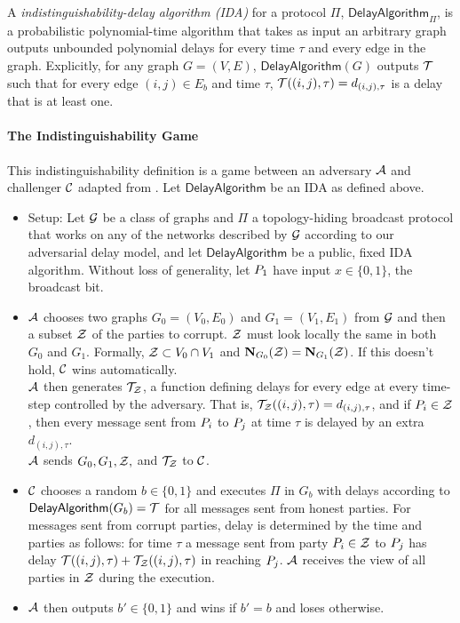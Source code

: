 \newcommand{\delayAlg}{\mathsf{DelayAlgorithm}}
\begin{definition}
	A \emph{indistinguishability-delay algorithm (IDA)} for a protocol $\Pi$, $\mathsf{Delay}$\-$\mathsf{Algorithm}_{\Pi}$, is a probabilistic polynomial-time algorithm that takes as input an arbitrary graph outputs unbounded polynomial delays for every time $\tau$ and every edge in the graph. Explicitly, for any graph $G = (V, E)$, $\delayAlg(G)$ outputs $\mathcal{T}$ such that for every edge $(i,j) \in E_b$ and time $\tau$, $\mathcal{T}((i,j), \tau) = d_{(i,j), \tau}$ is a delay that is at least one.
\end{definition}

\paragraph{The Indistinguishability Game}
This indistinguishability definition is a game between an adversary $\mathcal{A}$ and challenger $\mathcal{C}$ adapted from \cite{MOR15}. Let $\delayAlg$ be an IDA as defined above.
\begin{itemize}
	\item Setup: Let $\mathcal{G}$ be a class of graphs and $\Pi$ a topology-hiding broadcast protocol that works on any of the networks described by $\mathcal{G}$ according to our adversarial delay model, and let $\delayAlg$ be a public, fixed IDA algorithm. Without loss of generality, let $P_1$ have input $x \in \{0,1\}$, the broadcast bit.
	\item $\mathcal{A}$ chooses two graphs $G_0 = (V_0, E_0)$ and $G_1 = (V_1, E_1)$ from $\mathcal{G}$ and then a subset $\mathcal{Z}$ of the parties to corrupt. $\mathcal{Z}$ must look locally the same in both $G_0$ and $G_1$. Formally, $\mathcal{Z} \subset V_0 \cap V_1$ and $\mathbf{N}_{G_{0}}(\mathcal{Z}) = \mathbf{N}_{G_{1}}(\mathcal{Z})$. If this doesn't hold, $\mathcal{C}$ wins automatically.\\
	$\mathcal{A}$ then generates $\mathcal{T}_{\mathcal{Z}}$, a function defining delays for every edge at every time-step controlled by the adversary. That is, $\mathcal{T}_{\mathcal{Z}}((i,j), \tau) = d_{(i,j),\tau}$, and if $P_i \in \mathcal{Z}$, then every message sent from $P_i$ to $P_j$ at time $\tau$ is delayed by an extra $d_{(i,j), \tau}$.\\
	$\mathcal{A}$ sends $G_0, G_1, \mathcal{Z},$ and $\mathcal{T}_{\mathcal{Z}}$ to $\mathcal{C}$.
	
	\item $\mathcal{C}$ chooses a random $b \in \{0,1\}$ and executes $\Pi$ in $G_b$ with delays according to $\delayAlg(G_b) = \cT$ for all messages sent from honest parties. For messages sent from corrupt parties, delay is determined by the time and parties as follows: for time $\tau$ a message sent from party $P_i \in \mathcal{Z}$ to $P_j$ has delay $\mathcal{T}((i,j), \tau) + \mathcal{T}_{\mathcal{Z}}((i,j), \tau)$ in reaching $P_j$. $\mathcal{A}$ receives the view of all parties in $\mathcal{Z}$ during the execution.
	
	\item $\mathcal{A}$ then outputs $b' \in \{0,1\}$ and wins if $b' = b$ and loses otherwise.
\end{itemize}

